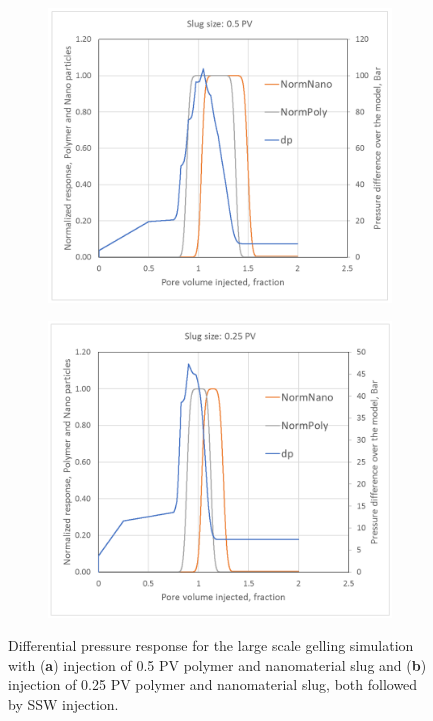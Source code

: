 \documentclass[nanomaterials,article,submit,moreauthors,pdftex]{Definitions/mdpi}
\begin{document}
\begin{figure}[h!] %
    \centering
    \begin{subfigure}[b]{.49\textwidth}
    \includegraphics[width=\textwidth]{fig/pDiff1.png}
    \caption{}
    \label{cht:pDiff1}
    \end{subfigure}
    \begin{subfigure}[b]{.49\textwidth}
    \includegraphics[width=\textwidth]{fig/pDiff2.png}
    \caption{}
    \label{cht:pDiff2}
    \end{subfigure}
    
    \caption{Differential pressure response for the large scale gelling simulation with (\textbf{a}) injection of 0.5 PV polymer and nanomaterial slug and (\textbf{b}) injection of 0.25 PV polymer and nanomaterial slug, both followed by SSW injection. }
    \label{cht:pDiff}
\end{figure}
\end{document}
